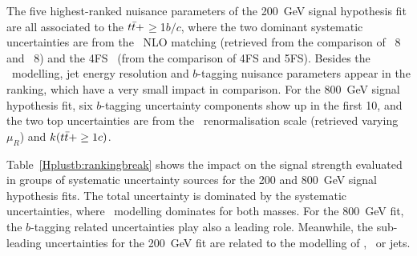 The five highest-ranked nuisance parameters of the 200~GeV signal hypothesis fit are all associated to the $t\bar{t}+$$\geq$1$b/c$, where the two dominant systematic uncertainties are from the \ttb\ NLO matching (retrieved from the comparison of \MGMCatNLOPYTHIA~8 and \POWHEGPYTHIA~8) and the 4FS \ttb\ (from the comparison of 4FS and 5FS). Besides the \ttbar\ modelling, jet energy resolution and $b$-tagging nuisance parameters appear in the ranking, which have a very small impact in comparison. For the 800~GeV signal hypothesis fit, six $b$-tagging uncertainty components show up in the first 10, and the two top uncertainties are from the \ttb\ renormalisation scale (retrieved varying $\mu_R$) and $k(t\bar{t}+\geq1c)$.

Table~\ref{Hplustb:rankingbreak} shows the impact on the signal strength evaluated in groups of systematic uncertainty sources for the 200 and 800~GeV signal hypothesis fits. The total uncertainty is dominated by the systematic uncertainties, where \ttb\ modelling dominates for both masses. For the 800~GeV fit, the $b$-tagging related uncertainties play also a leading role. Meanwhile, the sub-leading uncertainties for the 200~GeV fit are related to the modelling of \ttc, \ttl\ or jets.

